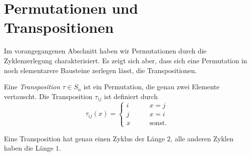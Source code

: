 %
%
%
\section{Permutationen und Transpositionen
\label{buch:section:permutationen-und-transpositionen}}
Im vorangegangenen Abschnitt haben wir Permutationen durch die
Zyklenzerlegung charakterisiert.
Es zeigt sich aber, dass sich eine Permutation in noch elementarere
Bausteine zerlegen lässt, die Transpositionen.

\begin{definition}
Eine {\em Transposition} $\tau\in S_n$ ist ein Permutation, die genau
zwei Elemente vertauscht.
%
Die Transposition $\tau_{i\!j}$ ist definiert durch
\[
\tau_{i\!j}(x)
=
\begin{cases}
i&\qquad x=j\\
j&\qquad x=i\\
x&\qquad\text{sonst.}
\end{cases}
\]
\end{definition}

Eine Transposition hat genau einen Zyklus der Länge $2$, alle anderen
Zyklen haben die Länge $1$.

